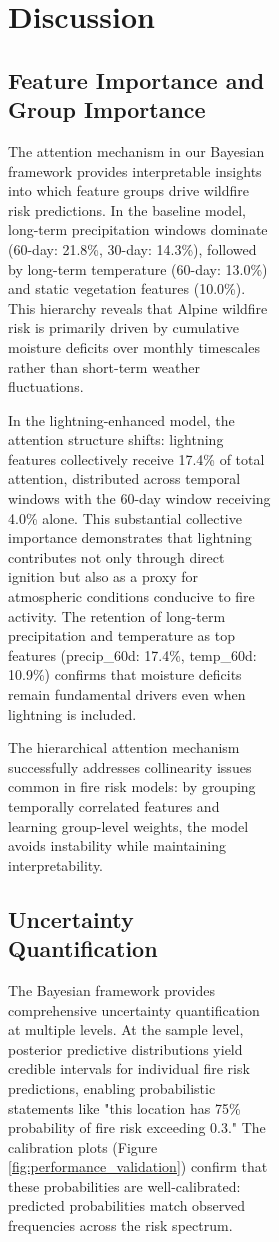 \documentclass[11pt,a4paper]{article}
\begin{document}
\begin{figure}[H]
\begin{figure}[H]
\begin{figure}[H]
\section{Discussion}

\subsection{Feature Importance and Group Importance}

The attention mechanism in our Bayesian framework provides interpretable insights into which feature groups drive wildfire risk predictions. In the baseline model, long-term precipitation windows dominate (60-day: 21.8\%, 30-day: 14.3\%), followed by long-term temperature (60-day: 13.0\%) and static vegetation features (10.0\%). This hierarchy reveals that Alpine wildfire risk is primarily driven by cumulative moisture deficits over monthly timescales rather than short-term weather fluctuations.

In the lightning-enhanced model, the attention structure shifts: lightning features collectively receive 17.4\% of total attention, distributed across temporal windows with the 60-day window receiving 4.0\% alone. This substantial collective importance demonstrates that lightning contributes not only through direct ignition but also as a proxy for atmospheric conditions conducive to fire activity. The retention of long-term precipitation and temperature as top features (precip\_60d: 17.4\%, temp\_60d: 10.9\%) confirms that moisture deficits remain fundamental drivers even when lightning is included.

The hierarchical attention mechanism successfully addresses collinearity issues common in fire risk models: by grouping temporally correlated features and learning group-level weights, the model avoids instability while maintaining interpretability.

\subsection{Uncertainty Quantification}

The Bayesian framework provides comprehensive uncertainty quantification at multiple levels. At the sample level, posterior predictive distributions yield credible intervals for individual fire risk predictions, enabling probabilistic statements like "this location has 75\% probability of fire risk exceeding 0.3." The calibration plots (Figure \ref{fig:performance_validation}) confirm that these probabilities are well-calibrated: predicted probabilities match observed frequencies across the risk spectrum.


\end{figure}
\end{figure}
\end{figure}
\end{document}
